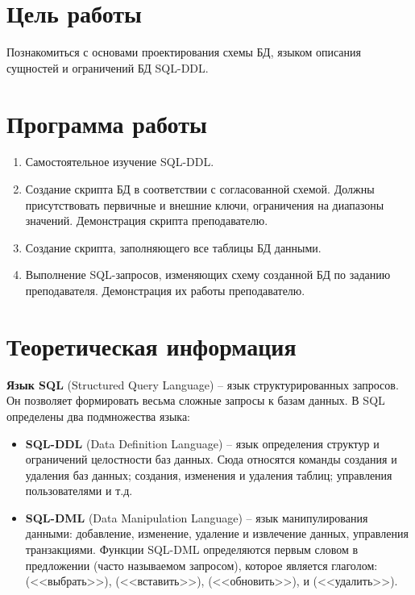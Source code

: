 





\tableofcontents
\newpage

\section{Цель работы}

Познакомиться с основами проектирования схемы БД, языком описания сущностей и ограничений БД SQL-DDL.

\section{Программа работы}

\begin{enumerate}
	\item Самостоятельное изучение SQL-DDL.
	\item Создание скрипта БД в соответствии с согласованной схемой. Должны присутствовать первичные и внешние ключи, ограничения на диапазоны значений. Демонстрация скрипта преподавателю. 
	\item Создание скрипта, заполняющего все таблицы БД данными.
	\item Выполнение SQL-запросов, изменяющих схему созданной БД по заданию преподавателя. Демонстрация их работы преподавателю.
\end{enumerate}

\section{Теоретическая информация}

\textbf{Язык SQL} (Structured Query Language) -- язык структурированных запросов. Он позволяет формировать весьма сложные запросы к базам данных. В SQL определены два подмножества языка:

\begin{itemize}
	\item \textbf{SQL-DDL} (Data Definition Language) -- язык определения структур и ограничений целостности баз данных. Сюда относятся команды создания и удаления баз данных; создания, изменения и удаления таблиц; управления пользователями и т.д.
	\item \textbf{SQL-DML} (Data Manipulation Language) -- язык манипулирования данными: добавление, изменение, удаление и извлечение данных, управления транзакциями. Функции SQL-DML определяются первым словом в предложении (часто называемом запросом), которое является глаголом:  (<<выбрать>>),  (<<вставить>>),  (<<обновить>>), и  (<<удалить>>). 
\end{itemize}

